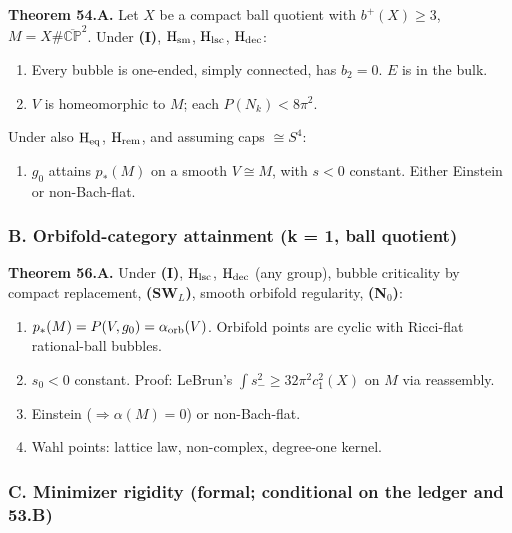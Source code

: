 \documentclass[
  10pt,
]{report}
\providecommand{\tightlist}{%
  \setlength{\itemsep}{0pt}\setlength{\parskip}{0pt}}
\begin{document}
\textbf{Theorem 54.A.} Let \(X\) be a compact ball quotient with
\(b^+(X)\ge3\), \(M=X\#\overline{\mathbb{CP}}^2\). Under \textbf{(I)},
\(\mathrm H_{\rm sm}\), \(\mathrm H_{\rm lsc}\),
\(\mathrm H_{\rm dec}\):

\begin{enumerate}
\def\labelenumi{(\roman{enumi})}
\item
  Every bubble is one-ended, simply connected, has \(b_2=0\). \(E\) is
  in the bulk.
\item
  \(V\) is homeomorphic to \(M\); each \(P(N_k)<8\pi^2\).
\end{enumerate}

Under also \(\mathrm H_{\rm eq}\), \(\mathrm H_{\rm rem}\), and assuming
caps \(\cong S^4\):

\begin{enumerate}
\def\labelenumi{(\roman{enumi})}
\setcounter{enumi}{2}
\tightlist
\item
  \(g_0\) attains \(p_*(M)\) on a smooth \(V\cong M\), with \(s<0\)
  constant. Either Einstein or non-Bach-flat.
\end{enumerate}

\hypertarget{b.-orbifold-category-attainment-k-1-ball-quotient}{%
\subsubsection{B. Orbifold-category attainment (k = 1, ball
quotient)}\label{b.-orbifold-category-attainment-k-1-ball-quotient}}

\textbf{Theorem 56.A.} Under \textbf{(I)}, \(\mathrm H_{\rm lsc}\),
\(\mathrm H_{\rm dec}\) (any group), bubble criticality by compact
replacement, \textbf{(SW\(_L\))}, smooth orbifold regularity,
\textbf{(N\(_0\))}:

\begin{enumerate}
\def\labelenumi{(\roman{enumi})}
\item
  \(p_*(M)=P(V,g_0)=\alpha_{\rm orb}(V)\). Orbifold points are cyclic
  with Ricci-flat rational-ball bubbles.
\item
  \(s_0<0\) constant. Proof: LeBrun's \(\int s_-^2\ge32\pi^2c_1^2(X)\)
  on \(M\) via reassembly.
\item
  Einstein (\(\Rightarrow\alpha(M)=0\)) or non-Bach-flat.
\item
  Wahl points: lattice law, non-complex, degree-one kernel.
\end{enumerate}

\hypertarget{c.-minimizer-rigidity-formal-conditional-on-the-ledger-and-53.b}{%
\subsubsection{C. Minimizer rigidity (formal; conditional on the ledger
and
53.B)}\label{c.-minimizer-rigidity-formal-conditional-on-the-ledger-and-53.b}}
\end{document}
